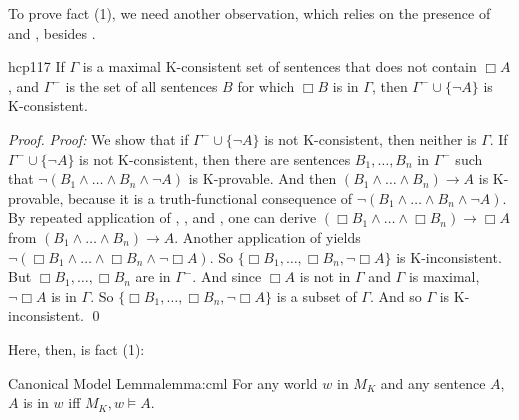 To prove fact (1), we need another observation, which relies on the presence of
 and , besides .

\begin{observation}{hcp117}
  If $\Gamma$ is a maximal K-consistent set of sentences that does not
  contain $\Box A$, and $\Gamma^{-}$ is the set of all sentences $B$ for which
  $\Box B$ is in $\Gamma$, then $\Gamma^{-} \cup \{ \neg A \}$ is
  K-consistent.
\end{observation}
\begin{proof}
  \emph{Proof:} We show that if $\Gamma^{-} \cup \{ \neg A \}$ is not
  K-consistent, then neither is $\Gamma$. If $\Gamma^- \cup \{ \neg A \}$ is not
  K-consistent, then there are sentences $B_1,\ldots,B_n$ in $\Gamma^{-}$ such
  that $\neg(B_1\land\ldots\land B_n \land \neg A)$ is K-provable. And then
  $(B_1\land\ldots\land B_n) \to A$ is K-provable, because it is a
  truth-functional consequence of $\neg(B_1\land\ldots\land B_n \land \neg A)$.
  By repeated application of , , and , one can derive
  $(\Box B_1\land\ldots\land \Box B_n) \to \Box A$ from
  $(B_1\land\ldots\land B_n) \to A$. Another application of  yields
  $\neg (\Box B_1\land\ldots\land \Box B_n \land \neg\Box A)$. So
  $\{\Box B_1,\ldots,\Box B_n, \neg \Box A\}$ is K-inconsistent. But
  $\Box B_1,\ldots,\Box B_n$ are in $\Gamma^{-}$. And since $\Box A$ is not in
  $\Gamma$ and $\Gamma$ is maximal, $\neg \Box A$ is in $\Gamma$. So
  $\{\Box B_1,\ldots,\Box B_n, \neg \Box A\}$ is a subset of $\Gamma$. And so
  $\Gamma$ is K-inconsistent. \qed
\end{proof}

Here, then, is fact (1):

\begin{theorem}{Canonical Model Lemma}{lemma:cml}
  For any world $w$ in $M_K$ and any sentence $A$, $A$ is in $w$ iff
  $M_K,w \models A$.
\end{theorem}

